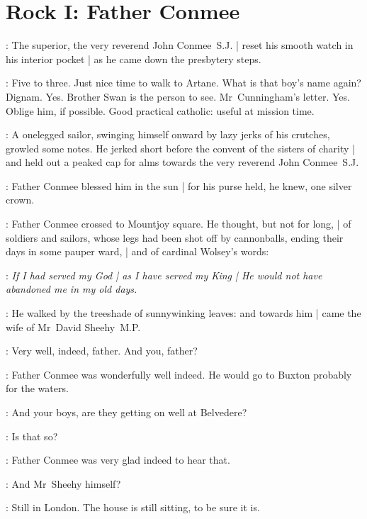 \section*{Rock I: Father Conmee}

:
The superior, the very reverend John Conmee~S.J. |
reset his smooth watch in his interior pocket |
as he came down the presbytery steps.

\conmeeint:
Five to three.
Just nice time to walk to Artane.
What is that boy's name again?
Dignam.
Yes.
Brother Swan is the person to see.
Mr~Cunningham's letter.
Yes.
Oblige him, if possible.
Good practical catholic:
useful at mission time.


:
A onelegged sailor,
swinging himself onward by lazy jerks of his crutches,
growled some notes.
He jerked short before the convent of the sisters of charity |
and held out a peaked cap for alms
towards the very reverend John Conmee~S.J.%

:
Father Conmee blessed him in the sun |
for his purse held,
he knew,
one silver crown.


:
Father Conmee crossed to Mountjoy square.
He thought,
but not for long, |
of soldiers and sailors,
whose legs had been shot off by cannonballs,
ending their days in some pauper ward, |
and of cardinal Wolsey's words:

\conmeeint:
\emph{If I had served my God |
as I have served my King |
He would not have abandoned me in my old days.}

:
He walked by the treeshade of sunnywinking leaves:
and towards him |
came the wife of Mr~David Sheehy~M.P.


\mrssheehy:
Very well, indeed, father.
And you, father?

:
Father Conmee was wonderfully well indeed.
He would go to Buxton probably for the waters.%

\conmee:
And your boys, are they getting on well at Belvedere?

\conmee:
Is that so?

:
Father Conmee was very glad indeed to hear that.

\conmee:
And Mr~Sheehy himself?

\mrssheehy:
Still in London.
The house is still sitting, to be sure it is.

